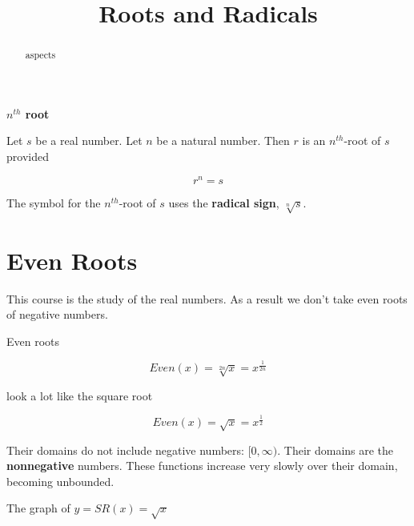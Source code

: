 \documentclass{ximera}
\title{Roots and Radicals}
\begin{document}
\begin{abstract}
aspects
\end{abstract}
\maketitle




\begin{definition} \item \textbf{\textcolor{green!50!black}{$n^{th}$ root}}


Let $s$ be a real number. Let $n$ be a natural number.  Then $r$ is an $n^{th}$-root of $s$ provided


\[    r^n = s     \]



The symbol for the $n^{th}$-root of $s$ uses the \textbf{radical sign}, $\sqrt[n]{s}$.

\end{definition}







\section{Even Roots}

This course is the study of the real numbers. As a result we don't take even roots of negative numbers.

Even roots

\[   Even(x) = \sqrt[2n]{x} = x^{\tfrac{1}{2n}}          \]

look a lot like the square root


\[   Even(x) = \sqrt{x} = x^{\tfrac{1}{2}}          \]



Their domains do not include negative numbers: $[0, \infty)$.  Their domains are the \textbf{nonnegative} numbers.  These functions increase very slowly over their domain, becoming unbounded.







The graph of $y = SR(x) = \sqrt{x}$
\end{document}

